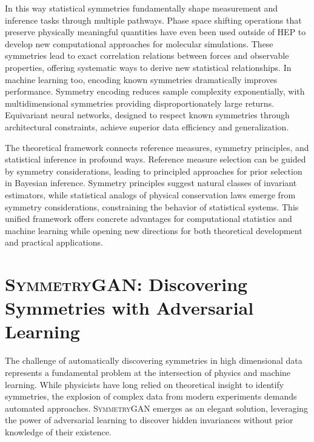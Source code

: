         In this way statistical symmetries fundamentally shape measurement and inference tasks through multiple pathways.
        Phase space shifting operations that preserve physically meaningful quantities have even been used outside of HEP to develop new computational approaches for molecular simulations.
        These symmetries lead to exact correlation relations between forces and observable properties, offering systematic ways to derive new statistical relationships.
        In machine learning too, encoding known symmetries dramatically improves performance.
        Symmetry encoding reduces sample complexity exponentially, with multidimensional symmetries providing disproportionately large returns.
        Equivariant neural networks, designed to respect known symmetries through architectural constraints, achieve superior data efficiency and generalization.

        The theoretical framework connects reference measures, symmetry principles, and statistical inference in profound ways.
        Reference measure selection can be guided by symmetry considerations, leading to principled approaches for prior selection in Bayesian inference. 
        Symmetry principles suggest natural classes of invariant estimators, while statistical analogs of physical conservation laws emerge from symmetry considerations, constraining the behavior of statistical systems.
        This unified framework offers concrete advantages for computational statistics and machine learning while opening new directions for both theoretical development and practical applications.

\section{\textsc{SymmetryGAN}: Discovering Symmetries with Adversarial Learning}
\label{sec:symmetry-gan-main}
The challenge of automatically discovering symmetries in high dimensional data represents a fundamental problem at the intersection of physics and machine learning.
%
While physicists have long relied on theoretical insight to identify symmetries, the explosion of complex data from modern experiments demands automated approaches.
%
\textsc{SymmetryGAN} emerges as an elegant solution, leveraging the power of adversarial learning to discover hidden invariances without prior knowledge of their existence.

